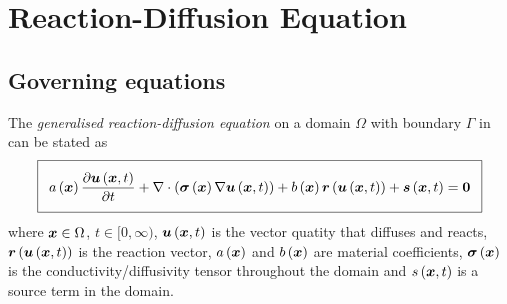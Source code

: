 \section{Reaction-Diffusion Equation} 
\label{sec:ReactionDiffusionEquations}

\subsection{Governing equations}
The \emph{generalised reaction-diffusion equation} on a domain $\Omega$ with boundary
$\Gamma$ in \OpenCMISS can be stated as
\begin{equation}
  \addtolength{\fboxsep}{5pt}
  \boxed{
    \fnof{a}{\vectr{x}}\delby{\fnof{\vectr{u}}{\vectr{x},t}}{t}+
    \divergence{}{\pbrac{\fnof{\tensor{\sigma}}{\vectr{x}}\gradient{}{\fnof{\vectr{u}}{\vectr{x},t}}}}+
    \fnof{b}{\vectr{x}}\fnof{\vectr{r}}{\fnof{\vectr{u}}{\vectr{x},t}}+\fnof{\vectr{s}}{\vectr{x},t}=\vectr{0}  
  }
  \label{eqn:GeneralisedReactionDiffusionEquation}
\end{equation}
where $ \boldsymbol{x} \in\Omega$, $t\in[0,\infty)$, $  \boldsymbol{u} \left(  \boldsymbol{x} ,t \right) $
  is the vector quatity that diffuses and reacts,
  $  \boldsymbol{r} \left(   \boldsymbol{u} \left(  \boldsymbol{x} ,t \right)  \right) $ is the reaction vector,
  $ a\left(  \boldsymbol{x}  \right) $ and $ b\left(  \boldsymbol{x}  \right) $ are material coefficients,
  $ \boldsymbol{\mathit{\sigma}}\left(  \boldsymbol{x}  \right) $ is the conductivity/diffusivity tensor
  throughout the domain and $ s\left(  \boldsymbol{x} ,t \right) $ is a source term in the
  domain.
